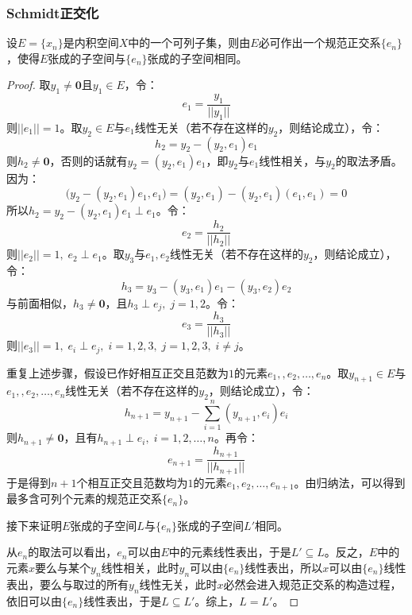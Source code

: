 \subsubsection{Schmidt正交化}
\begin{theorem}[Schmidt正交化]
	\label{theo:Schmidt}
	设$E=\{x_n\}$是内积空间$X$中的一个可列子集，则由$E$必可作出一个规范正交系$\{e_n\}$，使得$E$张成的子空间与$\{e_n\}$张成的子空间相同。
\end{theorem}
\begin{proof}
	取$y_1\ne\mathbf{0}$且$y_1\in E$，令：
	\begin{equation*}
		e_1=\frac{y_1}{||y_1||}
	\end{equation*}
	则$||e_1||=1$。取$y_2\in E$与$e_1$线性无关（若不存在这样的$y_2$，则结论成立），令：
	\begin{equation*}
		h_2=y_2-(y_2,e_1)e_1
	\end{equation*}
	则$h_2\ne\mathbf{0}$，否则的话就有$y_2=(y_2,e_1)e_1$，即$y_2$与$e_1$线性相关，与$y_2$的取法矛盾。因为：
	\begin{equation*}
		\Big(y_2-(y_2,e_1)e_1,e_1\Big)=(y_2,e_1)-(y_2,e_1)(e_1,e_1)=0
	\end{equation*}
	所以$h_2=y_2-(y_2,e_1)e_1\perp e_1$。令：
	\begin{equation*}
		e_2=\frac{h_2}{||h_2||}
	\end{equation*}
	则$||e_2||=1,\;e_2\perp e_1$。取$y_3$与$e_1,e_2$线性无关（若不存在这样的$y_2$，则结论成立），令：
	\begin{equation*}
		h_3=y_3-(y_3,e_1)e_1-(y_3,e_2)e_2
	\end{equation*}
	与前面相似，$h_3\ne\mathbf{0}$，且$h_3\perp e_j,\;j=1,2$。令：
	\begin{equation*}
		e_3=\frac{h_3}{||h_3||}
	\end{equation*}
	则$||e_3||=1,\;e_i\perp e_j,\;i=1,2,3,\;j=1,2,3,\;i\ne j$。\par
	重复上述步骤，假设已作好相互正交且范数为$1$的元素$e_1,,e_2,\dots,e_{n}$。取$y_{n+1}\in E$与$e_1,,e_2,\dots,e_{n}$线性无关（若不存在这样的$y_2$，则结论成立），令：
	\begin{equation*}
		h_{n+1}=y_{n+1}-\sum_{i=1}^{n}(y_{n+1},e_i)e_i
	\end{equation*}
	则$h_{n+1}\ne\mathbf{0}$，且有$h_{n+1}\perp e_i,\;i=1,2,\dots,n$。再令：
	\begin{equation*}
		e_{n+1}=\frac{h_{n+1}}{||h_{n+1}||}
	\end{equation*}
	于是得到$n+1$个相互正交且范数均为$1$的元素$e_1,e_2,\dots,e_{n+1}$。由归纳法，可以得到最多含可列个元素的规范正交系$\{e_n\}$。\par
	接下来证明$E$张成的子空间$L$与$\{e_n\}$张成的子空间$L'$相同。\par
	从$e_n$的取法可以看出，$e_n$可以由$E$中的元素线性表出，于是$L'\subseteq L$。反之，$E$中的元素$x$要么与某个$y_n$线性相关，此时$y_n$可以由$\{e_n\}$线性表出，所以$x$可以由$\{e_n\}$线性表出，要么与取过的所有$y_n$线性无关，此时$x$必然会进入规范正交系的构造过程，依旧可以由$\{e_n\}$线性表出，于是$L\subseteq L'$。综上，$L=L'$。
\end{proof}
